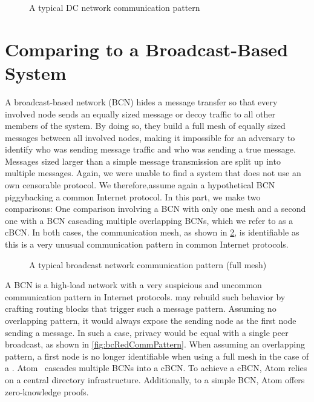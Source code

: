 \begin{figure}[ht]\centering
	
	\caption{A typical DC network communication pattern}
	\label{fig:dcCommPattern}
\end{figure}


\section{Comparing \MessageVortex{} to a Broadcast-Based System}
A broadcast-based network (BCN) hides a message transfer so that every involved node sends an equally sized message or decoy traffic to all other members of the system. By doing so, they build a full mesh of equally sized messages between all involved nodes, making it impossible for an adversary to identify who was sending message traffic and who was sending a true message. Messages sized larger than a simple message transmission are split up into multiple messages. Again, we were unable to find a system that does not use an own censorable protocol. We therefore,assume again a hypothetical BCN piggybacking a common Internet protocol. In this part, we make two comparisons: One comparison involving a BCN with only one mesh and a second one with a BCN cascading multiple overlapping BCNs, which we refer to as a cBCN. In both cases, the communication mesh, as shown in \cref{fig:bcCommPattern}, is identifiable as this is a very unusual communication pattern in common Internet protocols.

\begin{figure}[ht]\centering
	
	\caption{A typical broadcast network communication pattern (full mesh)}
	\label{fig:bcCommPattern}
\end{figure}

A BCN is a high-load network with a very suspicious and uncommon communication pattern in Internet protocols. \MessageVortex{} may rebuild such behavior by crafting routing blocks that trigger such a message pattern. Assuming no overlapping pattern, it would always expose the sending node as the first node sending a message. In such a case, privacy would be equal with a single peer broadcast, as shown in \cref{fig:bcRedCommPattern}. When assuming an overlapping pattern, a first node is no longer identifiable when using a full mesh in the case of a \VortexMessage{}. Atom~\cite{kwon2016atom} cascades multiple BCNs into a cBCN. To achieve a cBCN, Atom relies on a central directory infrastructure. Additionally, to a simple BCN, Atom offers zero-knowledge proofs.

